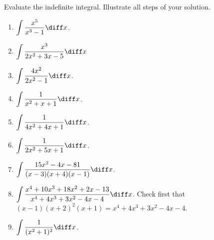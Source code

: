 Evaluate the indefinite integral. Illustrate all steps of your solution. 
\begin{multicols}{2}
\begin{enumerate}
\item $\displaystyle \int \frac{x^5 }{x^3-1}\diff x$.

\item $\displaystyle\int \frac{x^3 }{2x^2+3x-5}\diff x$ 

\item $\displaystyle\int \frac{4x^2 }{2x^2-1}\diff x$.

\item $\displaystyle\int \frac{1}{x^2+x+1}\diff x$.

\item $\displaystyle\int \frac{1}{4x^2+4x+1}\diff x$.

\item $\displaystyle\int \frac{1}{2x^2+5x+1}\diff x$.

\item $\displaystyle\int \frac{15x^2-4x-81}{ (x-3)(x +4)(x-1)}\diff x$.

\item $\displaystyle \int \frac {x^{4}+10x^{3}+ 18x^{2}+2x- 13}{x^{4} +4x^{3} +3x^{2}- 4x-4} \diff x$. 
Check first that $(x-1)(x+2)^2(x+1)= x^{4}+4x^{3}+3x^{2}-4x-4$. 

\item $\displaystyle \int \frac{1}{(x^2+1)^2}\diff x$.

\answer{$ $}
\end{enumerate}
\end{multicols}